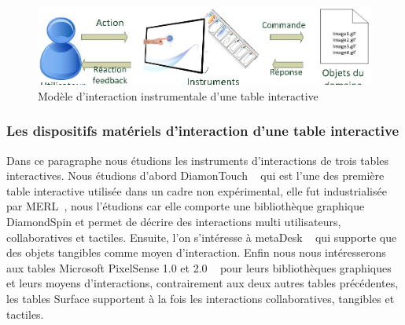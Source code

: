 \begin{figure}[ht]
\begin{center}
\includegraphics[width=360pt]{chap2/img-1}
\caption[b]{Modèle d'interaction instrumentale d'une table interactive}
\label{fig:chap2:1}
\end{center}
\end{figure}
\subsubsection{Les dispositifs matériels d'interaction d'une table interactive}
\label{sec:chap2:3:1}
Dans ce paragraphe nous étudions les instruments d'interactions de trois tables interactives. Nous étudions d'abord DiamonTouch ~\cite{Dietz2001} qui est l'une des première table interactive utilisée dans un cadre non expérimental, elle fut industrialisée par MERL~\cite{MitsubishiElectricResearchLaboratoriesb}, nous l'étudions car elle comporte une bibliothèque graphique DiamondSpin et permet de décrire des interactions multi utilisateurs, collaboratives et tactiles. Ensuite, l'on s'intéresse à metaDesk ~\cite{Ullmer1997} qui supporte que des objets tangibles comme moyen d'interaction. Enfin nous nous intéresserons aux tables Microsoft PixelSense 1.0 et 2.0 ~\cite{Microsoft2011} pour leurs bibliothèques graphiques et leurs moyens d'interactions, contrairement aux deux autres tables précédentes, les tables Surface supportent à la fois les interactions collaboratives, tangibles et tactiles.


